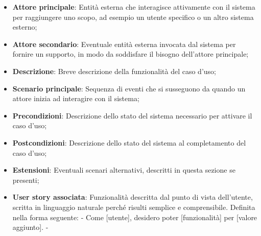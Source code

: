 \documentclass[10pt]{article}
\begin{document}
\begin{justify}
\begin{itemize}
            \item \textbf{Attore principale}: Entità esterna che interagisce attivamente con il sistema per raggiungere uno scopo, ad esempio un utente specifico o un altro sistema esterno;
            \item \textbf{Attore secondario}: Eventuale entità esterna invocata dal sistema per fornire un supporto, in modo da soddisfare il bisogno dell’attore principale;
            \item \textbf{Descrizione}: Breve descrizione della funzionalità del caso d’uso;
            \item \textbf{Scenario principale}: Sequenza di eventi che si susseguono da quando un attore inizia ad interagire con il sistema;
            \item \textbf{Precondizioni}: Descrizione dello stato del sistema necessario per attivare il caso d’uso;
            \item \textbf{Postcondizioni}: Descrizione dello stato del sistema al completamento del caso d’uso;
            \item \textbf{Estensioni}: Eventuali scenari alternativi, descritti in questa sezione se presenti;
            \item \textbf{User story associata}: Funzionalità descritta dal punto di vista dell'utente, scritta in linguaggio naturale perché risulti semplice e comprensibile. Definita nella forma seguente: \newline
            - Come [utente], desidero poter [funzionalità] per [valore aggiunto]. -
        \end{itemize}


\end{justify}
\end{document}
